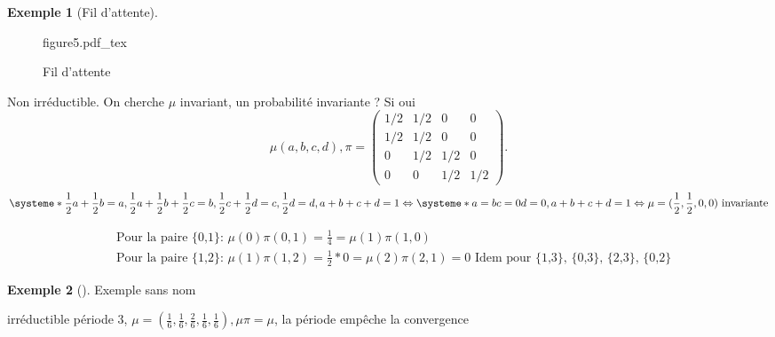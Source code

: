 \documentclass{article}
\newcommand{\incfig}[2][1]{%
	\def\svgwidth{#1\columnwidth}
	{#2.pdf_tex}
}
\theoremstyle{plain}%
\theoremstyle{definition}
\newtheorem{exmp}{Exemple}[section]
\theoremstyle{remark}
\begin{document}
\begin{exmp}[Fil d'attente]
	\begin{figure}[!htbp]
		\centering
		\incfig[0.5]{figure5}
		\caption{Fil d'attente}
		\label{}
	\end{figure}
	Non irréductible. On cherche $\mu$ invariant, un probabilité invariante ? Si oui 
	\[
		\mu (a,b,c,d), \pi = \begin{pmatrix}
			1/2 & 1/2 & 0 & 0 \\
			1/2 & 1/2 & 0 & 0 \\
			0 & 1/2 & 1/2 & 0 \\
			0 & 0 & 1/2 & 1/2
		\end{pmatrix}
	.\]
	\[
		\systeme*{
			\frac{1}{2}a + \frac{1}{2}b = a,
			\frac{1}{2}a + \frac{1}{2}b + \frac{1}{2}c = b,
			\frac{1}{2}c + \frac{1}{2}d = c,
			\frac{1}{2}d = d,
			a+b+c+d = 1
			}
		\Leftrightarrow
		\systeme*{
			a =b
			c=0
			d=0,
			a+b+c+d = 1
			}
		\Leftrightarrow
		\mu = (\frac{1}{2}, \frac{1}{2}, 0, 0) \text{ invariante}
	\]
	
	\begin{align*}
		& \text{Pour la paire \{0,1\}: } \mu (0) \pi (0,1) = \frac{1}{4} = \mu (1) \pi (1,0) \\
		& \text{Pour la paire \{1,2\}: } \mu (1)\pi (1,2) = \frac{1}{2}*0 = \mu (2) \pi (2,1) = 0 \text{ Idem pour \{1,3\}, \{0,3\}, \{2,3\}, \{0,2\}}
	\end{align*}
\end{exmp}

\begin{exmp}[] 
	Exemple sans nom \\


	irréductible période 3, $ \mu =(\frac{1}{6}, \frac{1}{6}, \frac{2}{6}, \frac{1}{6}, \frac{1}{6}), \mu \pi = \mu  $, la période empêche la convergence 
\end{exmp}
\end{document}
